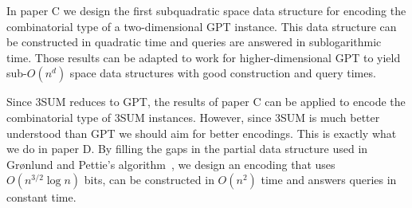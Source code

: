 In paper C we design the first subquadratic space data structure for encoding
the combinatorial type of a two-dimensional GPT instance. This data structure
can be constructed in quadratic time and queries are answered in sublogarithmic
time. Those results can be adapted to work for higher-dimensional GPT to yield
sub-\(O(n^d)\) space data structures with good construction and query times.

Since 3SUM reduces to GPT, the results of paper C can be applied to encode the
combinatorial type of 3SUM instances. However, since 3SUM is much better
understood than GPT we should aim for better encodings. This is exactly what we
do in paper D. By filling the gaps in the partial data structure
used in Gr\o nlund and Pettie's algorithm~\cite{GP18}, we design an encoding
that uses \(O(n^{3/2} \log n)\) bits, can be constructed in \(O(n^2)\) time and
answers queries in constant time.

